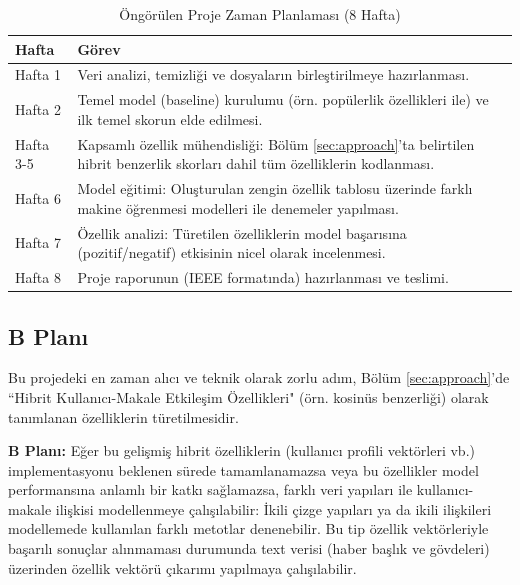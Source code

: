 \documentclass[conference]{IEEEtran}
\begin{document}
\begin{table}[h!]
  \caption{Öngörülen Proje Zaman Planlaması (8 Hafta)}
  \label{tab:zaman_planlamasi}
  \centering
  \begin{tabular}{@{}l p{6cm}@{}} 
    \toprule
    \textbf{Hafta} & \textbf{Görev} \\
    \midrule
    Hafta 1 & Veri analizi, temizliği ve dosyaların birleştirilmeye hazırlanması. \\
    \addlinespace %
    Hafta 2 & Temel model (baseline) kurulumu (örn. popülerlik özellikleri ile) ve ilk temel skorun elde edilmesi. \\
    \addlinespace
    Hafta 3-5 & Kapsamlı özellik mühendisliği: Bölüm \ref{sec:approach}'ta belirtilen hibrit benzerlik skorları dahil tüm özelliklerin kodlanması. \\
    \addlinespace
    Hafta 6 & Model eğitimi: Oluşturulan zengin özellik tablosu üzerinde farklı makine öğrenmesi modelleri ile denemeler yapılması. \\
    \addlinespace
    Hafta 7 & Özellik analizi: Türetilen özelliklerin model başarısına (pozitif/negatif) etkisinin nicel olarak incelenmesi. \\
    \addlinespace
    Hafta 8 & Proje raporunun (IEEE formatında) hazırlanması ve teslimi. \\
    \bottomrule
  \end{tabular}
\end{table}

\subsection{B Planı}
\label{subsec:planb}

Bu projedeki en zaman alıcı ve teknik olarak zorlu adım, Bölüm \ref{sec:approach}'de ``Hibrit Kullanıcı-Makale Etkileşim Özellikleri" (örn. kosinüs benzerliği) olarak tanımlanan özelliklerin türetilmesidir.

\textbf{B Planı:} Eğer bu gelişmiş hibrit özelliklerin (kullanıcı profili vektörleri vb.) implementasyonu beklenen sürede tamamlanamazsa veya bu özellikler model performansına anlamlı bir katkı sağlamazsa, farklı veri yapıları ile kullanıcı-makale ilişkisi modellenmeye çalışılabilir: İkili çizge yapıları ya da ikili ilişkileri modellemede kullanılan farklı metotlar denenebilir. Bu tip özellik vektörleriyle başarılı sonuçlar alınmaması durumunda text verisi (haber başlık ve gövdeleri) üzerinden özellik vektörü çıkarımı yapılmaya çalışılabilir.
\end{document}
